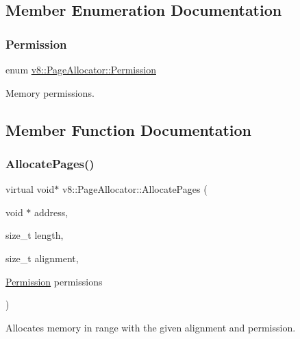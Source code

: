 \subsection{Member Enumeration Documentation}
\mbox{\label{classv8_1_1PageAllocator_a88f74b164fe97e053259f67a95758415}} 
\subsubsection{\texorpdfstring{Permission}{Permission}}
{\footnotesize\ttfamily enum \mbox{\hyperlink{classv8_1_1PageAllocator_a88f74b164fe97e053259f67a95758415}{v8\+::\+Page\+Allocator\+::\+Permission}}}

Memory permissions. 

\subsection{Member Function Documentation}
\mbox{\label{classv8_1_1PageAllocator_ab3a25ddd2601701f80ee67c4bf017ef7}} 
\subsubsection{\texorpdfstring{Allocate\+Pages()}{AllocatePages()}}
{\footnotesize\ttfamily virtual void$\ast$ v8\+::\+Page\+Allocator\+::\+Allocate\+Pages (\begin{DoxyParamCaption}\item[{void $\ast$}]{address,  }\item[{size\+\_\+t}]{length,  }\item[{size\+\_\+t}]{alignment,  }\item[{\mbox{\hyperlink{classv8_1_1PageAllocator_a88f74b164fe97e053259f67a95758415}{Permission}}}]{permissions }\end{DoxyParamCaption})\hspace{0.3cm}{\ttfamily [pure virtual]}}

Allocates memory in range with the given alignment and permission. \mbox{\label{classv8_1_1PageAllocator_a92c2f6dbb3afa6c47dafd4c12ab4641f}} 
